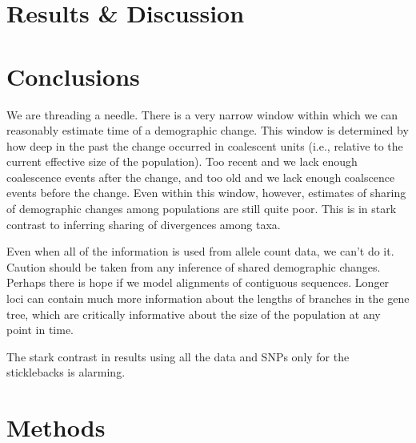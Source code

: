\ifembed{

}{}


\section{Results \& Discussion}



\section{Conclusions}

We are threading a needle.
There is a very narrow window within which we can reasonably estimate
time of a demographic change.
This window is determined by how deep in the past the change occurred
in coalescent units (i.e., relative to the current effective size
of the population).
Too recent and we lack enough coalescence events after the change, and too old
and we lack enough coalscence events before the change.
Even within this window, however, estimates of sharing of demographic
changes among populations are still quite poor.
This is in stark contrast to inferring sharing of divergences
among taxa.

Even when all of the information is used from allele count
data, we can't do it.
Caution should be taken from any inference of shared demographic changes.
Perhaps there is hope if we model alignments of contiguous sequences.
Longer loci can contain much more information about the lengths
of branches in the gene tree, which are critically informative
about the size of the population at any point in time.

The stark contrast in results using all the data and SNPs only
for the sticklebacks is alarming.


\section{Methods}


